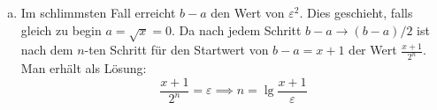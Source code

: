 \documentclass[11pt]{article}
\begin{document}
\begin{enumerate}[a)]
  \item Im schlimmsten Fall erreicht $b-a$ den Wert von $\varepsilon^2$.
    Dies geschieht, falls gleich zu begin $a=\sqrt{x}=0$. Da nach jedem Schritt
    $b-a \to (b-a)/2$ ist nach dem $n$-ten Schritt f\"ur den Startwert
    von $b-a=x+1$ der Wert $\frac{x+1}{2^n}$. Man erh\"alt als L\"osung:
    \[ \frac{x+1}{2^n} = \varepsilon \implies n= \lg{\frac{x+1}{\varepsilon}} \] 


\end{enumerate}
\end{document}
